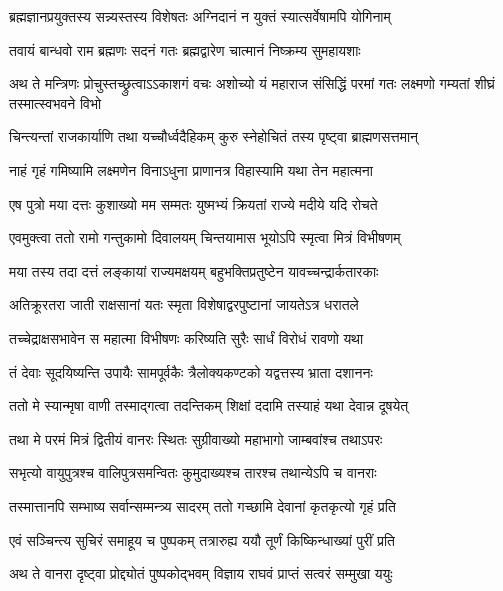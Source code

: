 \twolineshloka
{ब्रह्मज्ञानप्रयुक्तस्य सन्न्यस्तस्य विशेषतः}
{अग्निदानं न युक्तं स्यात्सर्वेषामपि योगिनाम्}%

\twolineshloka
{तवायं बान्धवो राम ब्रह्मणः सदनं गतः}
{ब्रह्मद्वारेण चात्मानं निष्क्रम्य सुमहायशाः}%

\threelineshloka
{अथ ते मन्त्रिणः प्रोचुस्तच्छ्रुत्वाऽऽकाशगं वचः}
{अशोच्यो यं महाराज संसिद्धिं परमां गतः}
{लक्ष्मणो गम्यतां शीघ्रं तस्मात्स्वभवने विभो}%

\twolineshloka
{चिन्त्यन्तां राजकार्याणि तथा यच्चौर्ध्वदैहिकम्}
{कुरु स्नेहोचितं तस्य पृष्ट्वा ब्राह्मणसत्तमान्}%


\twolineshloka
{नाहं गृहं गमिष्यामि लक्ष्मणेन विनाऽधुना}
{प्राणानत्र विहास्यामि यथा तेन महात्मना}%

\twolineshloka
{एष पुत्रो मया दत्तः कुशाख्यो मम सम्मतः}
{युष्मभ्यं क्रियतां राज्ये मदीये यदि रोचते}%

\twolineshloka
{एवमुक्त्वा ततो रामो गन्तुकामो दिवालयम्}
{चिन्तयामास भूयोऽपि स्मृत्वा मित्रं विभीषणम्}%

\twolineshloka
{मया तस्य तदा दत्तं लङ्कायां राज्यमक्षयम्}
{बहुभक्तिप्रतुष्टेन यावच्चन्द्रार्कतारकाः}%

\twolineshloka
{अतिक्रूरतरा जाती राक्षसानां यतः स्मृता}
{विशेषाद्वरपुष्टानां जायतेऽत्र धरातले}%

\twolineshloka
{तच्चेद्राक्षसभावेन स महात्मा विभीषणः}
{करिष्यति सुरैः सार्धं विरोधं रावणो यथा}%

\twolineshloka
{तं देवाः सूदयिष्यन्ति उपायैः सामपूर्वकैः}
{त्रैलोक्यकण्टको यद्वत्तस्य भ्राता दशाननः}%

\twolineshloka
{ततो मे स्यान्मृषा वाणी तस्माद्गत्वा तदन्तिकम्}
{शिक्षां ददामि तस्याहं यथा देवान्न दूषयेत्}%

\twolineshloka
{तथा मे परमं मित्रं द्वितीयं वानरः स्थितः}
{सुग्रीवाख्यो महाभागो जाम्बवांश्च तथाऽपरः}%

\twolineshloka
{सभृत्यो वायुपुत्रश्च वालिपुत्रसमन्वितः}
{कुमुदाख्यश्च तारश्च तथान्येऽपि च वानराः}%

\twolineshloka
{तस्मात्तानपि सम्भाष्य सर्वान्सम्मन्त्र्य सादरम्}
{ततो गच्छामि देवानां कृतकृत्यो गृहं प्रति}%

\twolineshloka
{एवं सञ्चिन्त्य सुचिरं समाहूय च पुष्पकम्}
{तत्रारुह्य ययौ तूर्णं किष्किन्धाख्यां पुरीं प्रति}%

\twolineshloka
{अथ ते वानरा दृष्ट्वा प्रोद्द्योतं पुष्पकोद्भवम्}
{विज्ञाय राघवं प्राप्तं सत्वरं सम्मुखा ययुः}%

